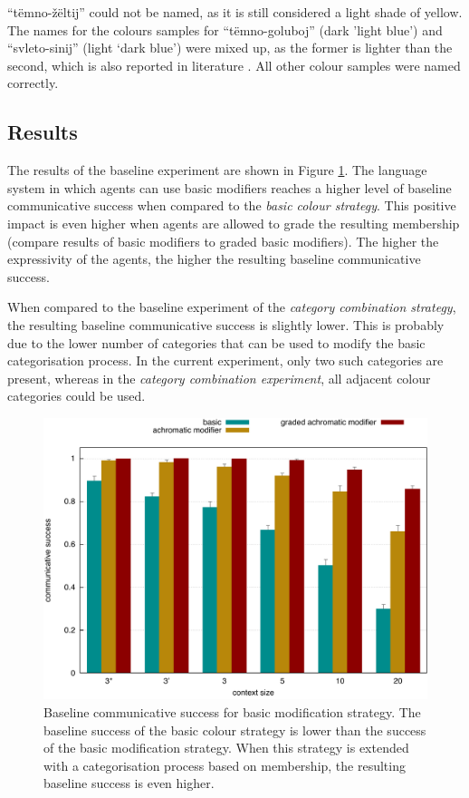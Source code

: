 ``t\"emno-\v z\"eltij'' could not be
named, as it is still considered a light shade of yellow. The names
for the colours samples for ``t\"emno-goluboj'' (dark 'light blue')
and ``svleto-sinij'' (light `dark blue') were mixed up, as the former
is lighter than the second, which is also reported in literature
\citep{safuanova07russian}. All other colour samples were named
correctly.

\subsection{Results}

The results of the baseline experiment are shown in Figure
\ref{f:ams-baseline}. The language system in which agents can use
basic modifiers reaches a higher level of baseline communicative
success when compared to the \emph{basic colour strategy}. This
positive impact is even higher when agents are allowed to grade the
resulting membership (compare results of basic modifiers to
graded basic modifiers). The higher the expressivity of the
agents, the higher the resulting baseline communicative success.

When compared to the baseline experiment of the \emph{category
  combination strategy}, the resulting baseline communicative success
is slightly lower. This is probably due to the lower number of
categories that can be used to modify the basic categorisation
process. In the current experiment, only two such categories are
present, whereas in the \emph{category combination experiment}, all
adjacent colour categories could be used.

\begin{figure}[htpb]
  \centering
  \includegraphics[width=.8\textwidth]{./achromatic/figures/baseline.pdf}
  \caption[Baseline communicative success for basic modification
  strategy]{Baseline communicative success for basic modification
    strategy. The baseline success of the basic colour strategy is
    lower than the success of the basic modification strategy. When
    this strategy is extended with a categorisation process based on
    membership, the resulting baseline success is even higher.}
  \label{f:ams-baseline}
\end{figure}

